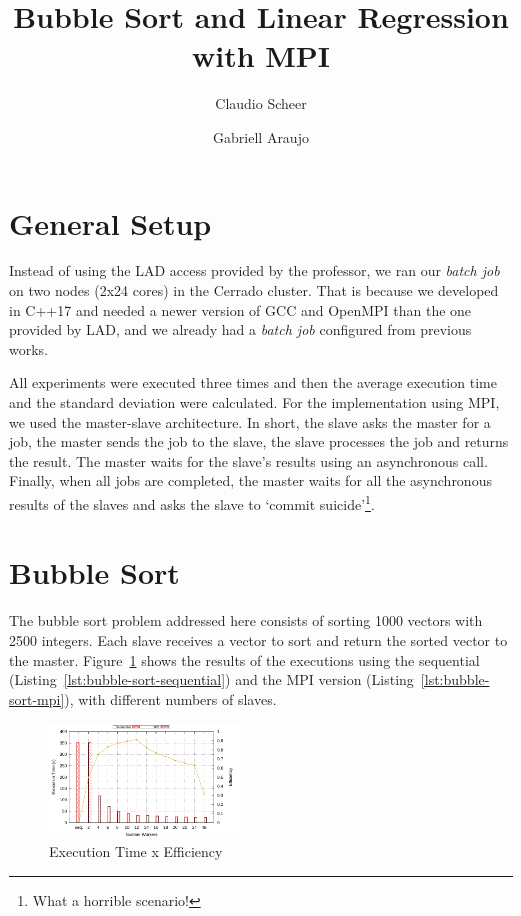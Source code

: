 \documentclass[10pt, twocolumn]{report}
\begin{document}
\title{Bubble Sort and Linear Regression with MPI}

\author[1]{Claudio Scheer}
\author[1]{Gabriell Araujo}

\maketitle

\section {General Setup}
Instead of using the LAD access provided by the professor, we ran our \textit{batch job} on two nodes (2x24 cores) in the Cerrado cluster. That is because we developed in C++17 and needed a newer version of GCC and OpenMPI than the one provided by LAD, and we already had a \textit{batch job} configured from previous works.

All experiments were executed three times and then the average execution time and the standard deviation were calculated. For the implementation using MPI, we used the master-slave architecture. In short, the slave asks the master for a job, the master sends the job to the slave, the slave processes the job and returns the result. The master waits for the slave's results using an asynchronous call. Finally, when all jobs are completed, the master waits for all the asynchronous results of the slaves and asks the slave to `commit suicide'\footnote{What a horrible scenario!}.

\section{Bubble Sort}
The bubble sort problem addressed here consists of sorting 1000 vectors with 2500 integers. Each slave receives a vector to sort and return the sorted vector to the master. Figure~\ref{fig:bubble-sort-time} shows the results of the executions using the sequential (Listing~\ref{lst:bubble-sort-sequential}) and the MPI version (Listing~\ref{lst:bubble-sort-mpi}), with different numbers of slaves.

\begin{figure}[ht]
	\centering
	\includegraphics[width=0.45\textwidth]{../logs/scripts/bubble-sort-time.pdf}
	\caption{Execution Time x Efficiency}
	\label{fig:bubble-sort-time}
\end{figure}
\end{document}
